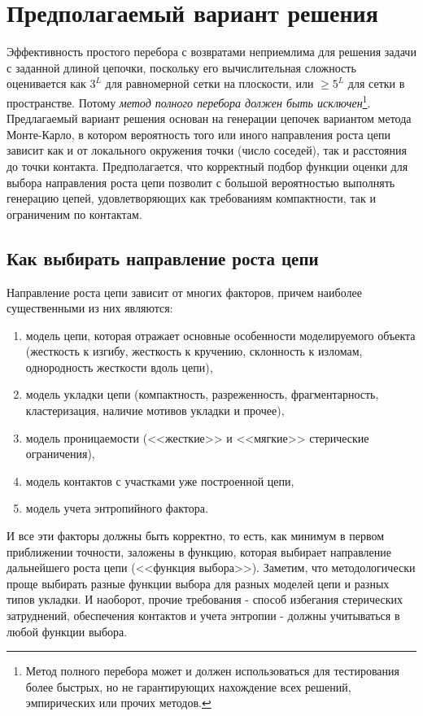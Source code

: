 \documentclass[tikz,a4paper]{scrartcl} %
\begin{document}
\section*{Предполагаемый вариант решения}
Эффективность простого перебора с возвратами неприемлима для решения задачи с заданной длиной цепочки, поскольку его вычислительная сложность оценивается как $3^L$ для равномерной сетки на плоскости, или $\geq 5^L$ для сетки в пространстве. Потому \textit{метод полного перебора должен быть исключен}\footnote{Метод полного перебора может и должен использоваться для тестирования более быстрых, но не гарантирующих нахождение всех решений, эмпирических или прочих методов.}. Предлагаемый вариант решения основан на генерации цепочек вариантом метода Монте-Карло, в котором вероятность того или иного направления роста цепи зависит как и от локального окружения точки (число соседей), так и расстояния до точки контакта. Предполагается, что корректный подбор функции оценки для выбора направления роста цепи позволит с большой вероятностью выполнять генерацию цепей, удовлетворяющих как требованиям компактности, так и ограниченим по контактам.

\subsection*{Как выбирать направление роста цепи}
Направление роста цепи зависит от многих факторов, причем наиболее существенными из них являются:
\begin{enumerate}
\item модель цепи, которая отражает основные особенности моделируемого объекта (жесткость к изгибу, жесткость к кручению, склонность к изломам, однородность жесткости вдоль цепи), 
\item модель укладки цепи (компактность, разреженность, фрагментарность,  кластеризация, наличие мотивов укладки и прочее), 
\item модель проницаемости (<<жесткие>> и <<мягкие>> стерические ограничения), 
\item модель контактов с участками уже построенной цепи,
\item модель учета энтропийного фактора.
\end{enumerate}
И все эти факторы должны быть корректно, то есть, как минимум в первом приближении точности, заложены в функцию, которая выбирает направление дальнейшего роста цепи (<<функция выбора>>). Заметим, что методологически проще выбирать разные функции выбора для разных моделей цепи и разных типов укладки. И наоборот, прочие требования - способ избегания стерических затруднений, обеспечения контактов и учета энтропии - должны учитываться в любой функции выбора. 
\end{document}
